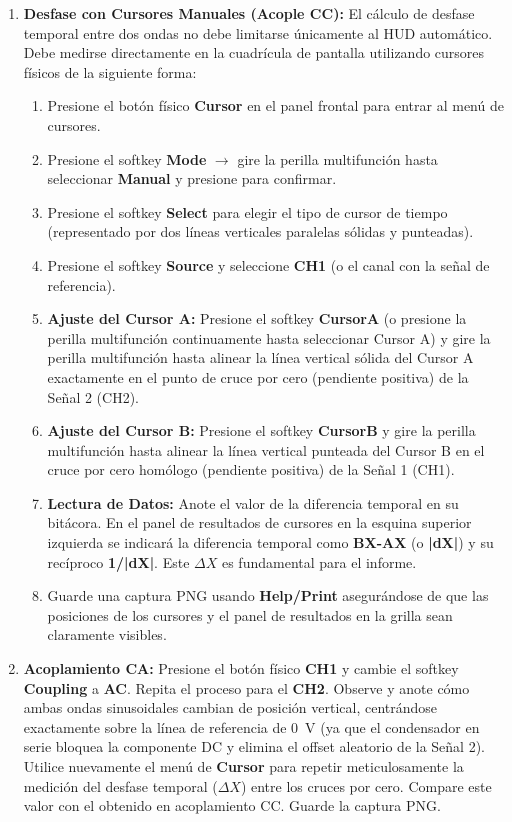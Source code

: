 \documentclass[12pt, letterpaper]{article}
\begin{document}
\begin{enumerate}[label=\textbf{2.3.\alph*)}]
    \item \textbf{Desfase con Cursores Manuales (Acople CC):} El cálculo de desfase temporal entre dos ondas no debe limitarse únicamente al HUD automático. Debe medirse directamente en la cuadrícula de pantalla utilizando cursores físicos de la siguiente forma:
    \begin{enumerate}[label=\roman*.]
        \item Presione el botón físico \textbf{Cursor} en el panel frontal para entrar al menú de cursores.
        \item Presione el softkey \textbf{Mode} $\rightarrow$ gire la perilla multifunción hasta seleccionar \textbf{Manual} y presione para confirmar.
        \item Presione el softkey \textbf{Select} para elegir el tipo de cursor de tiempo (representado por dos líneas verticales paralelas sólidas y punteadas).
        \item Presione el softkey \textbf{Source} y seleccione \textbf{CH1} (o el canal con la señal de referencia).
        \item \textbf{Ajuste del Cursor A:} Presione el softkey \textbf{CursorA} (o presione la perilla multifunción continuamente hasta seleccionar Cursor A) y gire la perilla multifunción hasta alinear la línea vertical sólida del Cursor A exactamente en el punto de cruce por cero (pendiente positiva) de la Señal 2 (CH2).
        \item \textbf{Ajuste del Cursor B:} Presione el softkey \textbf{CursorB} y gire la perilla multifunción hasta alinear la línea vertical punteada del Cursor B en el cruce por cero homólogo (pendiente positiva) de la Señal 1 (CH1).
        \item \textbf{Lectura de Datos:} Anote el valor de la diferencia temporal en su bitácora. En el panel de resultados de cursores en la esquina superior izquierda se indicará la diferencia temporal como \textbf{BX-AX} (o \textbf{|dX|}) y su recíproco \textbf{1/|dX|}. Este $\Delta X$ es fundamental para el informe.
        \item Guarde una captura PNG usando \textbf{Help/Print} asegurándose de que las posiciones de los cursores y el panel de resultados en la grilla sean claramente visibles.
    \end{enumerate}
    
    \item \textbf{Acoplamiento CA:} Presione el botón físico \textbf{CH1} y cambie el softkey \textbf{Coupling} a \textbf{AC}. Repita el proceso para el \textbf{CH2}. Observe y anote cómo ambas ondas sinusoidales cambian de posición vertical, centrándose exactamente sobre la línea de referencia de \SI{0}{\volt} (ya que el condensador en serie bloquea la componente DC y elimina el offset aleatorio de la Señal 2).
    Utilice nuevamente el menú de \textbf{Cursor} para repetir meticulosamente la medición del desfase temporal ($\Delta X$) entre los cruces por cero. Compare este valor con el obtenido en acoplamiento CC. Guarde la captura PNG.
    

\end{enumerate}
\end{document}
